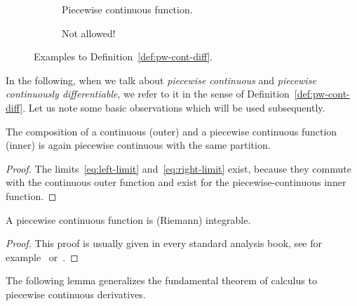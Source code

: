     \begin{figure}[t]\centering
        \begin{subfigure}[t]{0.48\textwidth}
            \centering
            
            \caption{Piecewise continuous function.}
            \label{fig:allowed}
        \end{subfigure}
        \hfill
        \begin{subfigure}[t]{0.48\textwidth}
            \centering
            
            \caption{Not allowed!}
            \label{fig:not-allowed}
        \end{subfigure}
        \caption{Examples to Definition~\ref{def:pw-cont-diff}.}
    \end{figure}

    In the following, when we talk about \emph{piecewise continuous} and \emph{piecewise continuously differentiable}, we refer to it in the sense of Definition~\ref{def:pw-cont-diff}.
    Let us note some basic observations which will be used subsequently.

    \begin{lemma}\label{lm:comp-pw-cont}
        The composition of a continuous (outer) and a piecewise continuous function (inner) is again piecewise continuous with the same partition.
    \end{lemma}
    \begin{proof}
        The limits~\eqref{eq:left-limit} and~\eqref{eq:right-limit} exist, because they commute with the continuous outer function and exist for the piecewise-continuous inner function.
    \end{proof}

    \begin{lemma}\label{lm:pc-integrable}
        A piecewise continuous function is (Riemann) integrable.
    \end{lemma}
    \begin{proof}
        This proof is usually given in every standard analysis book, see for example~\cite[Theorem~6.10]{Rudin76PrinciplesAnalysis} or~\cite[Example~11.16b]{Gathmann12GDM}.
    \end{proof}

    The following lemma generalizes the fundamental theorem of calculus to piecewise continuous derivatives.

